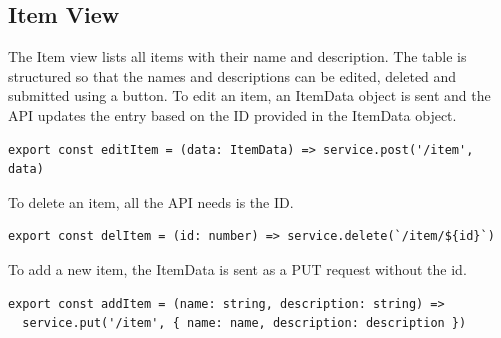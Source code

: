 \subsection{Item View}

The Item view lists all items with their name and description. The table is structured so that the names and descriptions can be edited, deleted and submitted using a button. To edit an item, an ItemData object is sent and the API updates the entry based on the ID provided in the ItemData object.

\begin{verbatim}
export const editItem = (data: ItemData) => service.post('/item', data)
\end{verbatim}

To delete an item, all the API needs is the ID.

\begin{verbatim}
export const delItem = (id: number) => service.delete(`/item/${id}`)
\end{verbatim}

To add a new item, the ItemData is sent as a PUT request without the id.

\begin{verbatim}
export const addItem = (name: string, description: string) =>
  service.put('/item', { name: name, description: description })
\end{verbatim}
